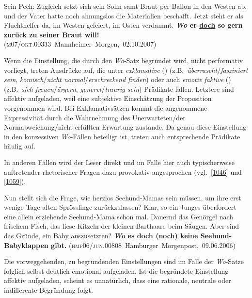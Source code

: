 \begin{exe}
	\ex\label{1058} 

	Sein Pech: Zugleich setzt sich sein Sohn samt Braut per Ballon in den Westen ab, und der Vater hatte noch ahnungslos die Materialien beschafft. Jetzt 		steht er als Fluchthelfer da, im Westen gefeiert, im Osten verdammt. \textbf{\textit{Wo} er \ul{doch} so gern zurück zu seiner Braut will!} 	  
	\newline              		
	\hbox{}\hfill\hbox{(\textsc{m07/okt.00333} Mannheimer Morgen, 02.10.2007)}
\end{exe}	
Wenn die Einstellung, die durch den \textit{Wo}-Satz begründet wird, nicht performativ vorliegt, treten Ausdrücke auf, die  unter \textit{exklamative} (\citealt[39--40]{Avis2001}) (z.B.\ \textit{überrascht}/\textit{fasziniert sein}, \textit{komisch}/\textit{nicht normal}/\textit{erschreckend finden}) oder auch  \textit{emotiv faktive} (\citealt[363]{Kiparsky1970}) (z.B.\ \textit{sich freuen}/\textit{ärgern}, \textit{ge\-nervt}/\textit{traurig sein}) Prädikate fallen. Letztere sind affektiv aufgeladen, weil eine subjektive Einschätzung der Proposition vorgenommen wird. Bei Exklamativsätzen kommt die angenommene Expressivität durch die Wahrnehmung des Unerwarte\-ten/der Normabweichung/nicht erfüllten Erwartung zustande. Da genau diese Einstellung in den konzessiven \textit{Wo}-Fällen beteiligt ist, treten auch entsprechende Prädikate häufig auf.

In anderen Fällen wird der Leser direkt und im Falle hier auch typischerweise auftretender rhetorischer Fragen dazu provokativ angesprochen (vgl.\ \ref{1046} und \ref{1059}).

\begin{exe}
	\ex\label{1059} 

	Nun stellt sich die Frage, wie herzlos Seehund-Mamas sein müssen, um ihre erst wenige Tage alten Sprösslinge zurückzulassen? Klar, so ein Junges 			überfordert eine allein erziehende Seehund-Mama schon mal. Dauernd das Genörgel nach frischem Fisch, das fiese Kitzeln der kleinen Barthaare beim 			Säugen. Aber sind das Gründe, ein Baby auszusetzten? \textbf{\textit{Wo} es \ul{doch} (noch) keine Seehund-Babyklappen gibt.}  
	\newline\hbox{}\hfill\hbox{(\textsc{hmp06/jun.00808} Hamburger Morgenpost, 09.06.2006)}
\end{exe}
Die vorweggehenden, zu begründenden Einstellungen sind im Falle der \textit{Wo}-Sätze folglich selbst deutlich emotional aufgeladen. Ist die begründete Einstellung affektiv aufgeladen, scheint es unnatürlich, dass eine rationale, neutrale oder indifferente Begründung folgt.

